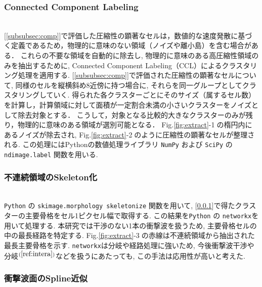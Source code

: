 \documentclass[a4j]{jarticle}
\begin{document}
\subsubsection{Connected Component Labeling}\label{subsubsec:CCL}
\mbox{}\\[-1.0ex]

[\ref{subsubsec:comp}]で評価した圧縮性の顕著なセルは，数値的な速度発散に基づく定義であるため，物理的に意味のない領域（ノイズや離小島）を含む場合がある．
これらの不要な領域を自動的に除去し, 物理的に意味のある高圧縮性領域のみを抽出するために, Connected Component Labeling（CCL）によるクラスタリング処理を適用する.
[\ref{subsubsec:comp}]で評価された圧縮性の顕著なセルについて, 同様のセルを縦横斜め8近傍に持つ場合に, それらを同一グループとしてクラスタリングしていく.
得られた各クラスターごとにそのサイズ（属するセル数）を計算し，計算領域に対して面積が一定割合未満の小さいクラスターをノイズとして除去対象とする．
こうして，対象となる比較的大きなクラスターのみが残り，物理的に意味のある領域が選別可能となる．
Fig.\ref{fig:extract}-\textcircled{\scriptsize 1}の楕円内にあるノイズが除去され, Fig.\ref{fig:extract}-\textcircled{\scriptsize 2}のように圧縮性の顕著なセルが整理される.
この処理にはPythonの数値処理ライブラリ \texttt{NumPy} および \texttt{SciPy} の \texttt{ndimage.label} 関数を用いる.

\subsubsection{不連続領域のSkeleton化} \label{subsubsec:skeleton}
\mbox{}\\[-1.0ex]

\texttt{Python} の \texttt{skimage.morphology skeletonize} 関数を用いて, [\ref{subsubsec:CCL}]で得たクラスターの主要骨格をセル1ピクセル幅で取得する.
この結果を\texttt{Python} の \texttt{networkx}を用いて処理する.
本研究では干渉のない1本の衝撃波を扱うため, 主要骨格セルの中の最長経路を特定する.
Fig.\ref{fig:extract}-\textcircled{\scriptsize 3}の赤線は不連続領域から抽出された最長主要骨格を示す.
\texttt{networkx}は分岐や経路処理に強いため,
今後衝撃波干渉や分岐$^{(\ref{ref:intera})}$などを扱うにあたっても, この手法は応用性が高いと考えた.

\subsubsection{衝撃波面のSpline近似} \label{subsubsec:spline}
\mbox{}\\[-1.0ex]
\end{document}
